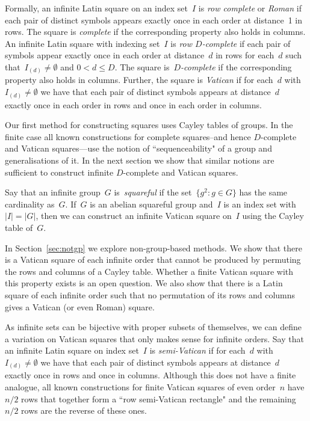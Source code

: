 \documentclass[12pt,a4paper]{article}
\begin{document}
Formally, an infinite Latin square on an index set~$I$  is {\em row complete} or {\em Roman} if each pair of distinct symbols appears exactly once in each order at distance~1 in rows.  The square is {\em complete} if the corresponding property also holds in columns.   An infinite Latin square with indexing set~$I$ is {\em row $D$-complete} if each pair of symbols appear exactly once in each order at distance~$d$ in rows for each~$d$ such that~$I_{(d)} \neq \emptyset$ and $0 < d \leq D$. The square is~{\em $D$-complete} if the corresponding property also holds in columns. Further, the square is {\em Vatican} if for each~$d$ with~$I_{(d)} \neq \emptyset$ we have that each pair of distinct symbols appears at distance~$d$ exactly once in each order in rows and once in each order in columns.



Our first method for constructing squares uses Cayley tables of groups.   In the finite case all known constructions for complete squares--and hence $D$-complete and Vatican squares---use the notion of ``sequenceability" of a group and generalisations of it.  In the next section we show that similar notions are sufficient to construct infinite $D$-complete and Vatican  squares.  

Say that an infinite group~$G$ is~{\em squareful} if the set~$\{ g^2 : g \in G\}$ has the same cardinality as~$G$.  If~$G$ is an abelian squareful group and~$I$ is an index set with~$|I| = |G|$, then we can construct an infinite Vatican square on~$I$ using the Cayley table of~$G$. 

In Section~\ref{sec:notgp} we explore non-group-based methods.  We show that there is a Vatican square of each infinite order that cannot be produced by permuting the rows and columns of a Cayley table.  Whether a finite Vatican square with this property exists is an open question.  We also show that there is a Latin square of each infinite order such that no permutation of its rows and columns gives a Vatican (or even Roman) square.


As infinite sets can be bijective with proper subsets of themselves, we can define a variation on Vatican squares that only makes sense for infinite orders.
Say that an infinite Latin square on index set~$I$ is {\em semi-Vatican} if for each~$d$ with~$I_{(d)} \neq \emptyset$ we have that each pair of distinct symbols appears at distance~$d$ exactly once in rows and once in columns.  Although this does not have a finite analogue, all known constructions for finite Vatican squares of even order~$n$ have $n/2$ rows that together form a ``row semi-Vatican rectangle" and the remaining $n/2$ rows are the reverse of these ones.
\end{document}
